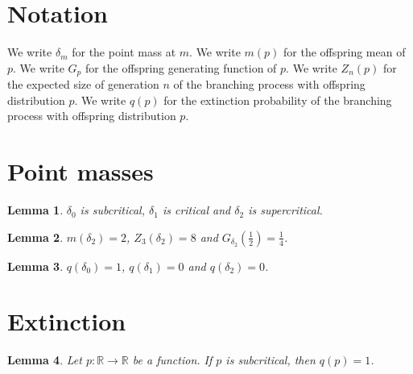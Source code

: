 \documentclass{article}
\newtheorem{lemma}{Lemma}
\begin{document}
\section{Notation}

We write $\delta_m$ for the point mass at $m$.
We write $m(p)$ for the offspring mean of $p$.
We write $G_p$ for the offspring generating function of $p$.
We write $Z_n(p)$ for the expected size of generation $n$ of the branching process with offspring distribution $p$.
We write $q(p)$ for the extinction probability of the branching process with offspring distribution $p$.

\section{Point masses}

\begin{lemma}\label{classes}
$\delta_0$ is subcritical, $\delta_1$ is critical and $\delta_2$ is supercritical.
\end{lemma}

\begin{lemma}\label{mean}
$m(\delta_2)=2$, $Z_3(\delta_2)=8$ and $G_{\delta_2}(\frac12)=\frac14$.
\end{lemma}

\begin{lemma}\label{extinction}
$q(\delta_0)=1$, $q(\delta_1)=0$ and $q(\delta_2)=0$.
\end{lemma}

\section{Extinction}

\begin{lemma}\label{subcritical}
Let $p:\mathbb{R}\to\mathbb{R}$ be a function. If $p$ is subcritical, then $q(p)=1$.
\end{lemma}
\end{document}
